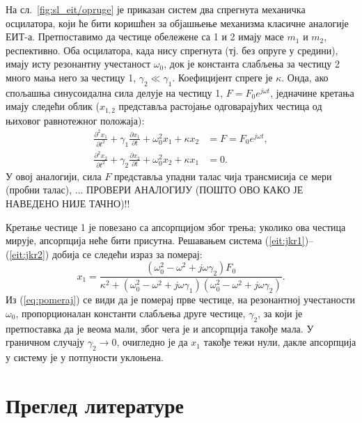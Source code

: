 \documentclass[main.tex]{subfiles}
\begin{document}
На сл.~\ref{fig:sl_eit/opruge} је приказан систем два спрегнута механичка осцилатора, који ће бити коришћен за објашњење механизма класичне аналогије ЕИТ-а. Претпоставимо да честице обележене са 1 и 2 имају масе $m_1$ и $m_2$, респективно. Оба осцилатора, када нису спрегнута (тј. без опруге у средини), имају исту резонантну учестаност $\omega_0$, док је константа слабљења за честицу 2 много мања него за честицу 1, $\gamma_2\ll\gamma_1$. Коефицијент спреге је $\kappa$. Онда, ако спољашња синусоидална сила делује на честицу 1, $F=F_0e^{j\omega t}$, једначине кретања имају следећи облик ($x_{1,2}$ представља растојање одговарајућих честица од њиховог равнотежног положаја):
\begin{align}
    \label{eq:spreg_osc}
    \frac{\partial^2x_1}{\partial t^2} + \gamma_1 \frac{\partial x_1}{\partial t} + \omega_0^2 x_1 + \kappa x_2 & = F = F_0 e^{j\omega t}, \label{eit:jkr1} \\
    \frac{\partial^2 x_2}{\partial t^2} + \gamma_2 \frac{\partial x_2}{\partial t} + \omega_0^2 x_2 + \kappa x_1 & = 0.\label{eit:jkr2}
\end{align}
У овој аналогији, сила $F$ представља упадни талас чија трансмисија се мери (пробни талас), ... ПРОВЕРИ АНАЛОГИЈУ (ПОШТО ОВО КАКО ЈЕ НАВЕДЕНО НИЈЕ ТАЧНО)!!

Кретање честице 1 је повезано са апсорпцијом због трења; уколико ова честица мирује, апсорпција неће бити присутна. Решавањем система (\ref{eit:jkr1})–(\ref{eit:jkr2}) добија се следећи израз за померај:
\begin{equation}
    \label{eq:pomeraj}
    x_1 = \frac{\left( \omega_0^2 - \omega^2 + j\omega\gamma_2 \right)F_0}{\kappa^2 + \left( \omega_0^2 - \omega^2 + j\omega\gamma_1 \right) \left( \omega_0^2 - \omega^2 + j\omega\gamma_2   \right)}.
\end{equation}
Из (\ref{eq:pomeraj}) се види да је померај прве честице, на резонантној учестаности $\omega_0$, пропорционалан константи слабљења друге честице, $\gamma_2$, за који је претпоставка да је веома мали, због чега је и апсорпција такође мала. У граничном случају $\gamma_2\to 0$, очигледно је да $x_1$ такође тежи нули, дакле апсорпција у систему је у потпуности уклоњена.

\section{Преглед литературе}%
\label{sec:pregled_literature}
\end{document}

